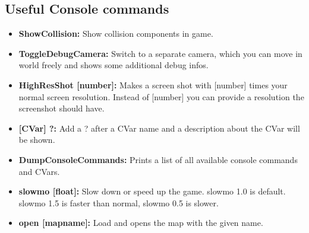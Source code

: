 \documentclass[10pt,a4paper]{article}
\begin{document}
\begin{multicols*}{2}
	\section{Useful Console commands}
	\begin{itemize}
		\item \textbf{ShowCollision:} Show collision components in game.
		\item \textbf{ToggleDebugCamera:} Switch to a separate camera, which you can move in world freely and shows some additional debug infos.
		\item \textbf{HighResShot [number]:} Makes a screen shot with [number] times your normal screen resolution. Instead of [number] you can provide a resolution the screenshot should have.
		\item \textbf{[CVar] ?:} Add a ? after a CVar name and a description about the CVar will be shown.
		\item \textbf{DumpConsoleCommands:} Prints a list of all available console commands and CVars.
		\item \textbf{slowmo [float]:} Slow down or speed up the game. slowmo 1.0 is default. slowmo 1.5 is faster than normal, slowmo 0.5 is slower.
		\item \textbf {open [mapname]:} Load and opens the map with the given name.
	\end{itemize}
	
\end{multicols*}
	
	\pagebreak
	
\end{document}

